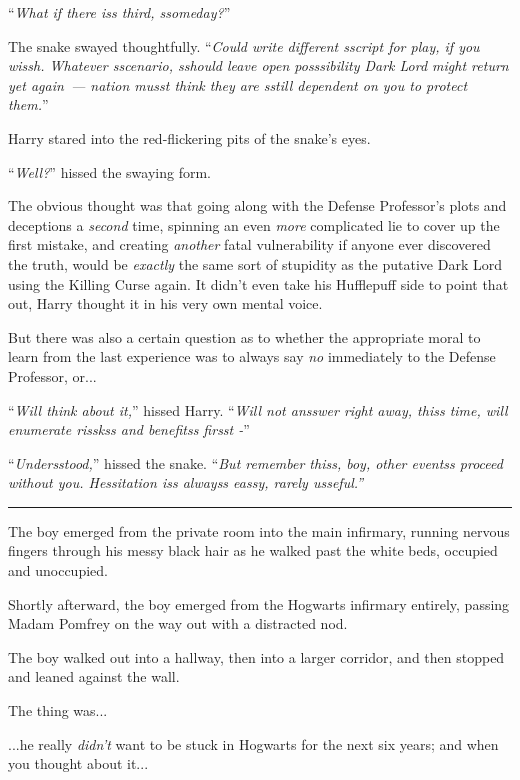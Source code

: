 ``\emph{What if there iss third, ssomeday?}''

The snake swayed thoughtfully. ``\emph{Could write different sscript for play, if you wissh. Whatever sscenario, sshould leave open posssibility Dark Lord might return yet again~--- nation musst think they are sstill dependent on you to protect them.}''

Harry stared into the red-flickering pits of the snake's eyes.

``\emph{Well?}'' hissed the swaying form.

The obvious thought was that going along with the Defense Professor's plots and deceptions a \emph{second} time, spinning an even \emph{more} complicated lie to cover up the first mistake, and creating \emph{another} fatal vulnerability if anyone ever discovered the truth, would be \emph{exactly} the same sort of stupidity as the putative Dark Lord using the Killing Curse again. It didn't even take his Hufflepuff side to point that out, Harry thought it in his very own mental voice.

But there was also a certain question as to whether the appropriate moral to learn from the last experience was to always say \emph{no} immediately to the Defense Professor, or...

``\emph{Will think about it,}'' hissed Harry. ``\emph{Will not ansswer right away, thiss time, will enumerate risskss and benefitss firsst -}''

``\emph{Undersstood,}'' hissed the snake. ``\emph{But remember thiss, boy, other eventss proceed without you. Hessitation iss alwayss eassy, rarely usseful.''}

\begin{center}\rule{3in}{0.4pt}\end{center}

The boy emerged from the private room into the main infirmary, running nervous fingers through his messy black hair as he walked past the white beds, occupied and unoccupied.

Shortly afterward, the boy emerged from the Hogwarts infirmary entirely, passing Madam Pomfrey on the way out with a distracted nod.

The boy walked out into a hallway, then into a larger corridor, and then stopped and leaned against the wall.

The thing was...

...he really \emph{didn't} want to be stuck in Hogwarts for the next six years; and when you thought about it...

